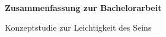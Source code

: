\newpage

\textbf{Zusammenfassung zur Bachelorarbeit}\\[0.1cm]
\begin{center}
Konzeptstudie zur Leichtigkeit des Seins
\end{center}
\blindtext
